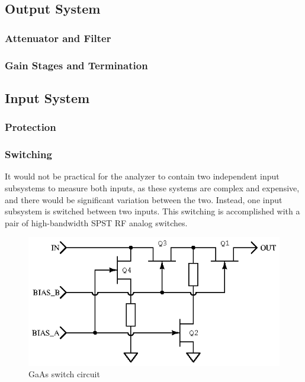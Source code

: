 \subsection{Output System}

\subsubsection{Attenuator and Filter}
\subsubsection{Gain Stages and Termination}

\subsection{Input System}

\subsubsection{Protection}

\subsubsection{Switching}


It would not be practical for the analyzer to contain two independent input
subsystems to measure both inputs, as these systems are complex and expensive,
and there would be significant variation between the two. Instead, one input
subsystem is switched between two inputs. This switching is accomplished with a
pair of high-bandwidth SPST RF analog switches.

\begin{figure}[H]
\centering
\includegraphics{gaassw}
\caption{GaAs switch circuit}
\label{fig:gaassw}
\end{figure}

